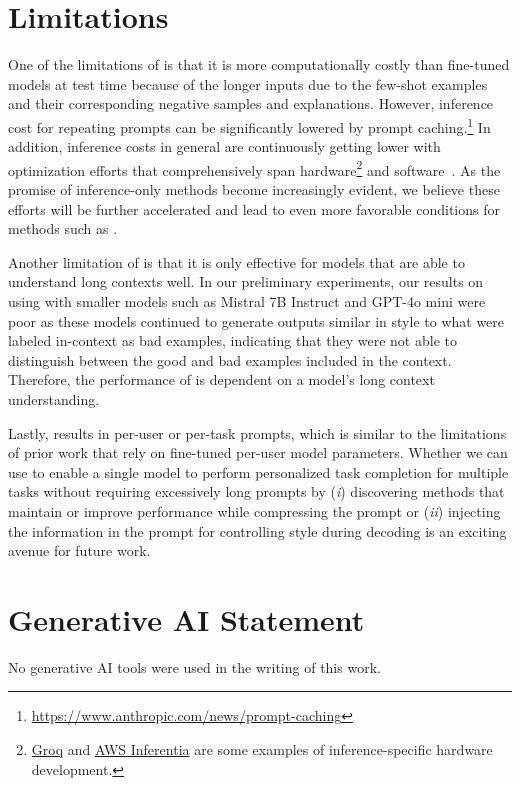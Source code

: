 \section*{Limitations} 

One of the limitations of \ours is that it is more computationally costly than fine-tuned models at test time because of the longer inputs due to the few-shot examples and their corresponding negative samples and explanations. 
However, inference cost for repeating prompts can be significantly lowered by prompt caching.\footnote{\url{https://www.anthropic.com/news/prompt-caching}} 
In addition, inference costs in general are continuously getting lower with optimization efforts that comprehensively span hardware\footnote{\href{https://groq.com/}{Groq} and  \href{https://aws.amazon.com/machine-learning/inferentia/}{AWS Inferentia} are some examples of inference-specific hardware development.} and software~\cite{kwon2023efficient}. 
As the promise of inference-only methods become increasingly evident, we believe these efforts will be further accelerated and lead to even more favorable conditions for methods such as \ours. 

Another limitation of \ours is that it is only effective for models that are able to understand long contexts well. 
In our preliminary experiments, our results on using \ours with smaller models such as Mistral 7B Instruct and GPT-4o mini were poor as these models continued to generate outputs similar in style to what were labeled in-context as bad examples, indicating that they were not able to distinguish between the good and bad examples included in the context.
Therefore, the performance of \ours is dependent on a model's long context understanding. 

Lastly, \ours results in per-user or per-task prompts, which is similar to the limitations of prior work that rely on fine-tuned per-user model parameters. 
Whether we can use \ours to enable a single model to perform personalized task completion for multiple tasks without requiring excessively long prompts by (\textit{i}) discovering methods that maintain or improve performance while compressing the prompt or (\textit{ii}) injecting the information in the prompt for controlling style during decoding is an exciting avenue for future work.





\section*{Generative AI Statement}
No generative AI tools were used in the writing of this work. 
